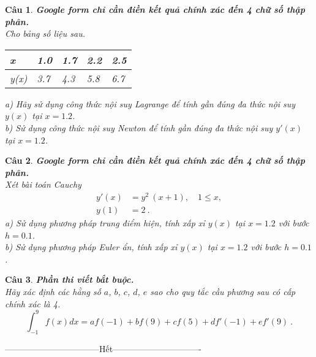 \documentclass[11pt]{article}
\newtheorem{bt}{Câu}
\begin{document}
\begin{bt} \textbf{Google form chỉ cần điền kết quả chính xác đến 4 chữ số thập phân.} \\
	Cho bảng số liệu sau. 
	\begin{center}
		\begin{tabular}[5]{l|l|l|l|l}
			x    & 1.0 & 1.7 & 2.2 & 2.5 \\ \hline
			y(x) & 3.7 & 4.3 & 5.8 & 6.7
		\end{tabular}	
	\end{center}
	a) Hãy sử dụng công thức nội suy Lagrange để tính gần đúng đa thức nội suy $y(x)$ tại $x=1.2$. \\
	b) Sử dụng công thức nội suy Newton để tính gần đúng đa thức nội suy $y'(x)$ tại $x=1.2$.	
\end{bt}

\begin{bt} \textbf{Google form chỉ cần điền kết quả chính xác đến 4 chữ số thập phân.} \\
	Xét bài toán Cauchy  
	\begin{align}
		y'(x) &= y^2 \ (x+1), \quad 1 \leq x, \\
		y(1)  &= 2 \ . 
	\end{align}
	a) Sử dụng phương pháp trung điểm hiện, tính xấp xỉ $y(x)$ tại $x=1.2$ với bước $h = 0.1$. \\
	b) Sử dụng phương pháp Euler ẩn, tính xấp xỉ $y(x)$ tại $x=1.2$ với bước $h = 0.1$. \\	
\end{bt}

\begin{bt} \textbf{Phần thi viết bắt buộc.} \\ 
	Hãy xác định các hằng số $a$, $b$, $c$, $d$, $e$ sao cho quy tắc cầu phương sau có cấp chính xác là 4.
	\[  \int_{-1}^{9} f(x) dx = a f(-1) + bf (9) + cf(5) + d f'(-1) + e f'(9) \ .  \]
\end{bt}

\centerline{———————————Hết——————————-}
\end{document}
